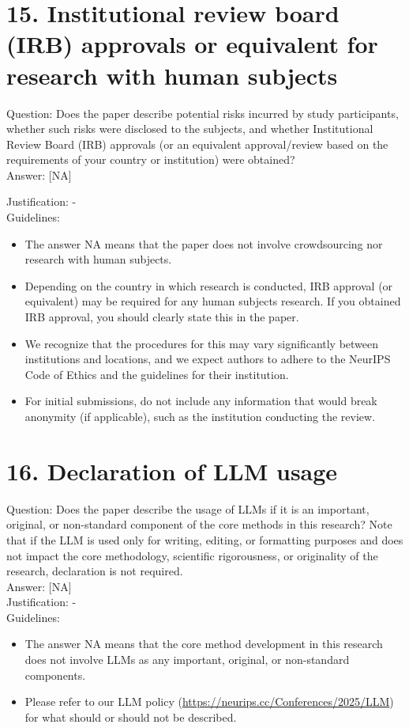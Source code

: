\documentclass[10pt]{article}
\begin{document}
\section*{15. Institutional review board (IRB) approvals or equivalent for research with human subjects}
Question: Does the paper describe potential risks incurred by study participants, whether such risks were disclosed to the subjects, and whether Institutional Review Board (IRB) approvals (or an equivalent approval/review based on the requirements of your country or institution) were obtained?\\[0pt]
Answer: [NA]

Justification: -\\
Guidelines:

\begin{itemize}
  \item The answer NA means that the paper does not involve crowdsourcing nor research with human subjects.
  \item Depending on the country in which research is conducted, IRB approval (or equivalent) may be required for any human subjects research. If you obtained IRB approval, you should clearly state this in the paper.
  \item We recognize that the procedures for this may vary significantly between institutions and locations, and we expect authors to adhere to the NeurIPS Code of Ethics and the guidelines for their institution.
  \item For initial submissions, do not include any information that would break anonymity (if applicable), such as the institution conducting the review.
\end{itemize}

\section*{16. Declaration of LLM usage}
Question: Does the paper describe the usage of LLMs if it is an important, original, or non-standard component of the core methods in this research? Note that if the LLM is used only for writing, editing, or formatting purposes and does not impact the core methodology, scientific rigorousness, or originality of the research, declaration is not required.\\[0pt]
Answer: [NA]\\
Justification: -\\
Guidelines:

\begin{itemize}
  \item The answer NA means that the core method development in this research does not involve LLMs as any important, original, or non-standard components.
  \item Please refer to our LLM policy (\href{https://neurips.cc/Conferences/2025/LLM}{https://neurips.cc/Conferences/2025/LLM}) for what should or should not be described.
\end{itemize}
\end{document}
